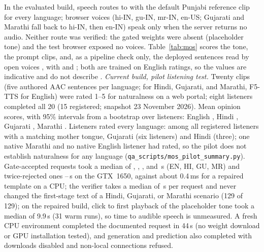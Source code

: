 In the evaluated build, speech routes to \indicf{} with the default Punjabi reference clip for every language; browser voices (hi-IN, gu-IN, mr-IN, en-US; Gujarati and Marathi fall back to hi-IN, then en-IN) speak only when the server returns no audio. Neither route was verified: the gated weights were absent (placeholder tone) and the test browser exposed no voices. Table~\ref{tab:mos} scores the tone, the prompt clips, and, as a pipeline check only, the deployed sentences read by open \mmstts{} voices \citep{pratap2023mms}, with \utmos{} \citep{saeki2022utmos} and \nisqa{} \citep{mittag2021nisqa}; both are trained on English ratings, so the values are indicative and do not describe \indicf{}.
\emph{Current build, pilot listening test.} Twenty clips (five authored AAC sentences per language; \indicf{} for Hindi, Gujarati, and Marathi, F5-TTS for English) were rated 1--5 for naturalness on a web portal; eight listeners completed all 20 (15 registered; snapshot 23 November 2026). Mean opinion scores, with 95\% intervals from a bootstrap over listeners: English \MosPilotEN{}, Hindi \MosPilotHI{}, Gujarati \MosPilotGU{}, Marathi \MosPilotMR{}. Listeners rated every language: among all registered listeners with a matching mother tongue, Gujarati \MosNatGU{} (six listeners) and Hindi \MosNatHI{} (three); one native Marathi and no native English listener had rated, so the pilot does not establish naturalness for any language (\texttt{qa\_scripts/mos\_pilot\_summary.py}).
Gate-accepted requests took a median of \LatMedAccEN{}, \LatMedAccHI{}, \LatMedAccGU{}, and \LatMedAccMR{}\,s (EN, HI, GU, MR) and twice-rejected ones \LatFbMin{}--\LatFbMax{}\,s on the GTX~1650, against about 0.4\,ms for a repaired template on a CPU; the verifier takes a median of \StageLlmThree{}\,s per request and never changed the first-stage text of a Hindi, Gujarati, or Marathi scenario (129 of 129); on the repaired build, click to first playback of the placeholder tone took a median of 9.9\,s (31 warm runs), so time to audible speech is unmeasured.
A fresh CPU environment completed the documented request in 44\,s (no weight download or GPU installation tested), and generation and prediction also completed with downloads disabled and non-local connections refused.

